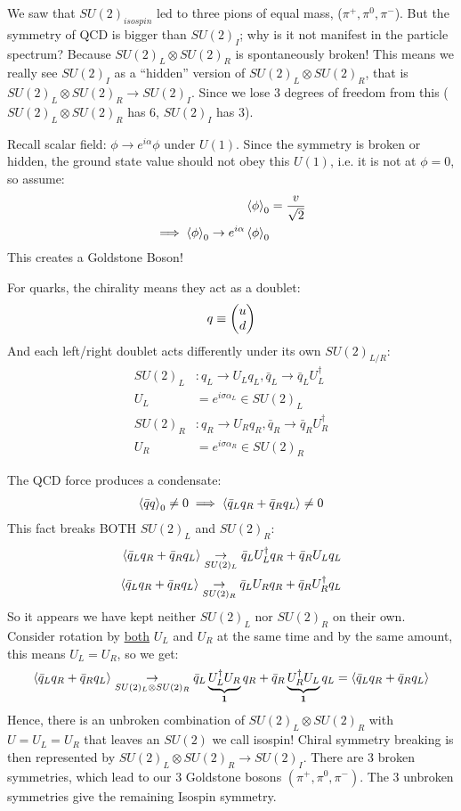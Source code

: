 We saw that $SU(2)_{isospin}$ led to three pions of equal mass, ($\pi^+,\pi^0,\pi^-$). But the symmetry of QCD is bigger than $SU(2)_I$; why is it not manifest in the particle spectrum? Because $SU(2)_L\otimes SU(2)_R$ is spontaneously broken! This means we really see $SU(2)_I$ as a ``hidden'' version of $SU(2)_L\otimes SU(2)_R$, that is $SU(2)_L\otimes SU(2)_R\to SU(2)_I$. Since we lose 3 degrees of freedom from this ($SU(2)_L\otimes SU(2)_R$ has 6, $SU(2)_I$ has 3).

Recall scalar field: $\phi\to e^{i\alpha}\phi$ under $U(1)$. Since the symmetry is broken or hidden, the ground state value should not obey this $U(1)$, i.e. it is not at $\phi=0$, so assume:
\begin{align*}
  \ev{\phi}_0&=\frac{v}{\sqrt{2}}\\
  \implies\ev{\phi}_0\to e^{i\alpha}\ev{\phi}_0
\end{align*}
This creates a Goldstone Boson!

For quarks, the chirality means they act as a doublet:
\begin{align*}
  q\equiv\pmqty{u\\d}
\end{align*}
And each left/right doublet acts differently under its own $SU(2)_{L/R}$:
\begin{align*}
  SU(2)_L&: q_L\to U_Lq_L, \bar{q}_L\to\bar{q}_LU_L^\dag\\
  U_L&=e^{i\sigma\alpha_L}\in SU(2)_L\\
  SU(2)_R&: q_R\to U_Rq_R, \bar{q}_R\to\bar{q}_RU_R^\dag\\
  U_R&=e^{i\sigma\alpha_R}\in SU(2)_R
\end{align*}

The QCD force produces a condensate:
\begin{align*}
  \ev{\bar{q}q}_0\neq0\implies \ev{\bar{q}_Lq_R+\bar{q}_Rq_L}\neq 0
\end{align*}
This fact breaks BOTH $SU(2)_L$ and $SU(2)_R$:
\begin{align*}
  \ev{\bar{q}_Lq_R+\bar{q}_Rq_L}\underset{SU(2)_L}{\to}
  \bar{q}_LU^\dag_Lq_R+\bar{q}_RU_Lq_L\\
  \ev{\bar{q}_Lq_R+\bar{q}_Rq_L}\underset{SU(2)_R}{\to}
  \bar{q}_LU_Rq_R+\bar{q}_RU^\dag_Rq_L
\end{align*}
So it appears we have kept neither $SU(2)_L$ nor $SU(2)_R$ on their own. Consider rotation by \underline{both} $U_L$ and $U_R$ at the same time and by the same amount, this means $U_L=U_R$, so we get:
\begin{align*}
  \ev{\bar{q}_Lq_R+\bar{q}_Rq_L}\underset{SU(2)_L\otimes SU(2)_R}{\to}
  \bar{q}_L\underbrace{U^\dag_LU_R}_{\bm{1}}q_R+
  \bar{q}_R\underbrace{U^\dag_RU_L}_{\bm{1}}q_L
  =\ev{\bar{q}_Lq_R+\bar{q}_Rq_L}
\end{align*}
Hence, there is an unbroken combination of $SU(2)_L\otimes SU(2)_R$ with $U=U_L=U_R$ that leaves an $SU(2)$ we call isospin! Chiral symmetry breaking is then represented by $SU(2)_L\otimes SU(2)_R\to SU(2)_I$. There are 3 broken symmetries, which lead to our 3 Goldstone bosons $(\pi^+,\pi^0,\pi^-)$. The 3 unbroken symmetries give the remaining Isospin symmetry.


